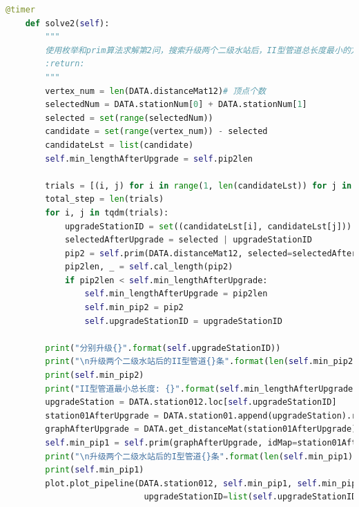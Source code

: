 \documentclass{cumcmthesis}
\begin{document}
\begin{appendices}
\begin{lstlisting}[language=python]
    @timer
    def solve2(self):
        """
        使用枚举和prim算法求解第2问，搜索升级两个二级水站后，II型管道总长度最小的方案
        :return:
        """
        vertex_num = len(DATA.distanceMat12)# 顶点个数
        selectedNum = DATA.stationNum[0] + DATA.stationNum[1]
        selected = set(range(selectedNum))
        candidate = set(range(vertex_num)) - selected
        candidateLst = list(candidate)
        self.min_lengthAfterUpgrade = self.pip2len

        trials = [(i, j) for i in range(1, len(candidateLst)) for j in range(i)]
        total_step = len(trials)
        for i, j in tqdm(trials):
            upgradeStationID = set((candidateLst[i], candidateLst[j]))
            selectedAfterUpgrade = selected | upgradeStationID
            pip2 = self.prim(DATA.distanceMat12, selected=selectedAfterUpgrade)
            pip2len, _ = self.cal_length(pip2)
            if pip2len < self.min_lengthAfterUpgrade:
                self.min_lengthAfterUpgrade = pip2len
                self.min_pip2 = pip2
                self.upgradeStationID = upgradeStationID

        print("分别升级{}".format(self.upgradeStationID))
        print("\n升级两个二级水站后的II型管道{}条".format(len(self.min_pip2)))
        print(self.min_pip2)
        print("II型管道最小总长度: {}".format(self.min_lengthAfterUpgrade))
        upgradeStation = DATA.station012.loc[self.upgradeStationID]
        station01AfterUpgrade = DATA.station01.append(upgradeStation).reset_index(drop=True)
        graphAfterUpgrade = DATA.get_distanceMat(station01AfterUpgrade)
        self.min_pip1 = self.prim(graphAfterUpgrade, idMap=station01AfterUpgrade["id"])
        print("\n升级两个二级水站后的I型管道{}条".format(len(self.min_pip1)))
        print(self.min_pip1)
        plot.plot_pipeline(DATA.station012, self.min_pip1, self.min_pip2,
                            upgradeStationID=list(self.upgradeStationID), name="pipelineAfterUpgrade")


\end{lstlisting}
\end{appendices}
\end{document}
